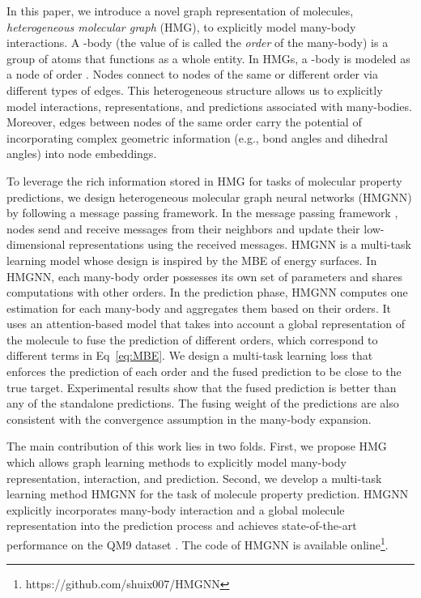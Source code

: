 \documentclass[conference]{IEEEtran}
\begin{document}
In this paper, we introduce a novel graph representation of molecules, \emph{heterogeneous molecular graph} (HMG), to explicitly model many-body interactions. A -body (the value of  is called the \emph{order} of the many-body) is a group of  atoms that functions as a whole entity. In HMGs, a -body is modeled as a node of order . Nodes connect to nodes of the same or different order via different types of edges. This heterogeneous structure allows us to explicitly model interactions, representations, and predictions associated with many-bodies. Moreover, edges between nodes of the same order carry the potential of incorporating complex geometric information (e.g., bond angles and dihedral angles) into node embeddings. 

To leverage the rich information stored in HMG for tasks of molecular property predictions, we design heterogeneous molecular graph neural networks (HMGNN) by following a message passing framework. In the message passing framework \cite{MPNN}, nodes send and receive messages from their neighbors and update their low-dimensional representations using the received messages. HMGNN is a multi-task learning \cite{MTL} model whose design is inspired by the MBE of energy surfaces. In HMGNN, each many-body order possesses its own set of parameters and shares computations with other orders. In the prediction phase, HMGNN computes one estimation for each many-body and aggregates them based on their orders. It uses an attention-based model that takes into account a global representation of the molecule to fuse the prediction of different orders, which correspond to different terms in Eq~\ref{eq:MBE}. We design a multi-task learning loss that enforces the prediction of each order and the fused prediction to be close to the true target. Experimental results show that the fused prediction is better than any of the standalone predictions. The fusing weight of the predictions are also consistent with the convergence assumption in the many-body expansion. 

The main contribution of this work lies in two folds. First, we propose HMG which allows graph learning methods to explicitly model many-body representation, interaction, and prediction. Second, we develop a multi-task learning method HMGNN for the task of molecule property prediction. HMGNN explicitly incorporates many-body interaction and a global molecule representation into the prediction process and achieves state-of-the-art performance on the QM9 dataset \cite{QM9-1, QM9-2}. The code of HMGNN is available online\footnote{https://github.com/shuix007/HMGNN}.
\end{document}
